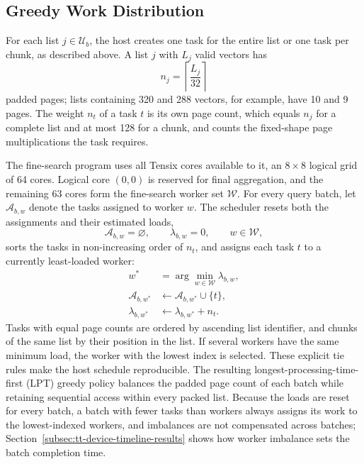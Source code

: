 \subsection{Greedy Work Distribution}
\label{subsec:greedy-work-distribution}

For each list \(j\in\mathcal{U}_b\), the host creates one task for the entire list or one task per chunk, as described above. A list \(j\) with \(L_j\) valid vectors has
\begin{equation}
n_j=\left\lceil\frac{L_j}{32}\right\rceil
\label{eq:list-scheduling-weight}
\end{equation}
padded pages; lists containing 320 and 288 vectors, for example, have 10 and 9 pages. The weight \(n_t\) of a task \(t\) is its own page count, which equals \(n_j\) for a complete list and at most 128 for a chunk, and counts the fixed-shape page multiplications the task requires.

The fine-search program uses all Tensix cores available to it, an \(8\times8\) logical grid of 64 cores. Logical core \((0,0)\) is reserved for final aggregation, and the remaining 63 cores form the fine-search worker set \(\mathcal{W}\). For every query batch, let \(\mathcal{A}_{b,w}\) denote the tasks assigned to worker \(w\). The scheduler resets both the assignments and their estimated loads,
\begin{equation}
\mathcal{A}_{b,w}=\varnothing,
\qquad
\lambda_{b,w}=0,
\qquad w\in\mathcal{W},
\end{equation}
sorts the tasks in non-increasing order of \(n_t\), and assigns each task \(t\) to a currently least-loaded worker:
\begin{align}
w^*&=\arg\min_{w\in\mathcal{W}}\lambda_{b,w},\\
\mathcal{A}_{b,w^*}&\leftarrow\mathcal{A}_{b,w^*}\cup\{t\},\\
\lambda_{b,w^*}&\leftarrow\lambda_{b,w^*}+n_t.
\label{eq:greedy-list-assignment}
\end{align}
Tasks with equal page counts are ordered by ascending list identifier, and chunks of the same list by their position in the list. If several workers have the same minimum load, the worker with the lowest index is selected. These explicit tie rules make the host schedule reproducible. The resulting longest-processing-time-first (LPT) greedy policy balances the padded page count of each batch while retaining sequential access within every packed list. Because the loads are reset for every batch, a batch with fewer tasks than workers always assigns its work to the lowest-indexed workers, and imbalances are not compensated across batches; Section~\ref{subsec:tt-device-timeline-results} shows how worker imbalance sets the batch completion time.

